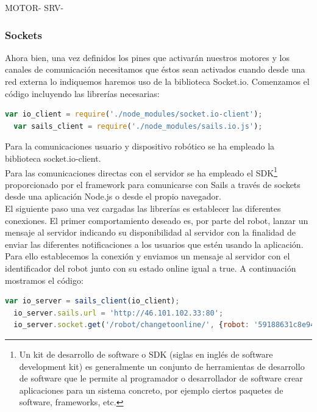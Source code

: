MOTOR-
SRV-


\subsubsection{Sockets}

Ahora bien, una vez definidos los pines que activarán nuestros motores y los canales de comunicación necesitamos que éstos sean activados cuando desde una red externa lo indiquemos haremos uso
de la biblioteca Socket.io. Comenzamos el código incluyendo las librerías necesarias:

\begin{lstlisting}[language=JavaScript]
  var io_client = require('./node_modules/socket.io-client');
  var sails_client = require('./node_modules/sails.io.js');
\end{lstlisting}

Para la comunicaciones usuario y dispositivo robótico se ha empleado la biblioteca socket.io-client.\\

Para las comunicaciones directas con el servidor se ha empleado el SDK\footnote{Un kit de desarrollo de software o SDK (siglas en inglés de software development kit) es generalmente un conjunto de herramientas
de desarrollo de software que le permite al programador o desarrollador de software crear aplicaciones para un sistema concreto, por ejemplo ciertos paquetes de software, frameworks, etc.} proporcionado por el framework
para comunicarse con Sails a través de sockets desde una aplicación Node.js o desde el propio navegador.\\


El siguiente paso una vez cargadas las librerías es establecer las diferentes conexiones. El primer comportamiento deseado es, por parte del robot, lanzar un mensaje al servidor indicando su disponibilidad al servidor con la finalidad de
enviar las diferentes notificaciones a los usuarios que estén usando la aplicación. Para ello establecemos la conexión y enviamos un mensaje al servidor con el identificador del robot junto con su estado online igual a true. A continuación mostramos
el código:\\

\begin{lstlisting}[language=JavaScript]
  var io_server = sails_client(io_client);
  io_server.sails.url = 'http://46.101.102.33:80';
  io_server.socket.get('/robot/changetoonline/', {robot: '59188631c8e94ba54f7a4bdc', online: true});
\end{lstlisting}



